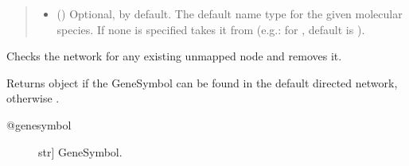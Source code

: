 \documentclass[letterpaper,10pt,english]{sphinxmanual}
\begin{document}
\begin{fulllineitems}
\begin{fulllineitems}
\begin{quote}
\begin{description}
\begin{itemize}
\item {} 
 () \textendash{} Optional,  by default. The default name type for the
given molecular species. If none is specified takes it from
 (e.g.: for
, default is ).

\end{itemize}

\end{description}\end{quote}

\end{fulllineitems}


\begin{fulllineitems}
\label{\detokenize{main:pypath.main.PyPath.delete_unmapped}}
Checks the network for any existing unmapped node and removes
it.

\end{fulllineitems}


\begin{fulllineitems}
\label{\detokenize{main:pypath.main.PyPath.dgenesymbol}}
Returns  object if the GeneSymbol
can be found in the default directed network,
otherwise .
\begin{description}
\item[{@genesymbol}] \leavevmode{[}str{]}
GeneSymbol.

\end{description}

\end{fulllineitems}


\begin{fulllineitems}
\label{\detokenize{main:pypath.main.PyPath.dgenesymbols}}
\end{fulllineitems}


\end{fulllineitems}
\end{document}
